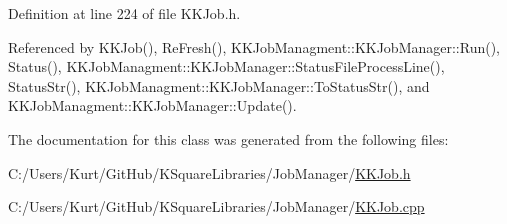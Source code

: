 Definition at line 224 of file K\+K\+Job.\+h.



Referenced by K\+K\+Job(), Re\+Fresh(), K\+K\+Job\+Managment\+::\+K\+K\+Job\+Manager\+::\+Run(), Status(), K\+K\+Job\+Managment\+::\+K\+K\+Job\+Manager\+::\+Status\+File\+Process\+Line(), Status\+Str(), K\+K\+Job\+Managment\+::\+K\+K\+Job\+Manager\+::\+To\+Status\+Str(), and K\+K\+Job\+Managment\+::\+K\+K\+Job\+Manager\+::\+Update().



The documentation for this class was generated from the following files\+:\begin{DoxyCompactItemize}
\item 
C\+:/\+Users/\+Kurt/\+Git\+Hub/\+K\+Square\+Libraries/\+Job\+Manager/\hyperlink{_k_k_job_8h}{K\+K\+Job.\+h}\item 
C\+:/\+Users/\+Kurt/\+Git\+Hub/\+K\+Square\+Libraries/\+Job\+Manager/\hyperlink{_k_k_job_8cpp}{K\+K\+Job.\+cpp}\end{DoxyCompactItemize}
